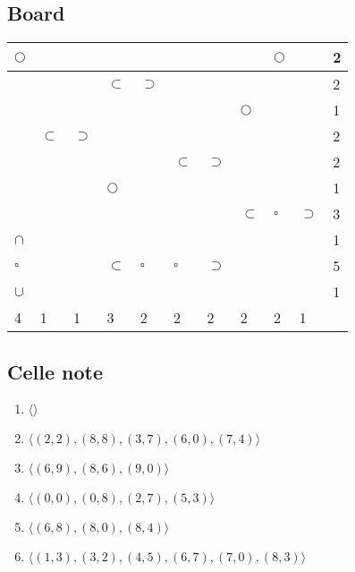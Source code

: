 \documentclass[11pt]{article}
\begin{document}
\subsection{Board}
\begin{table}[H]
    \begin{tabular}{|l|l|l|l|l|l|l|l|l|l||l|}
    \hline
     $\Circle$ &  &  &  &  &  &  &  & $\Circle$ &  & 2 \\ \hline
     &  &  & $\subset$ & $\supset$ &  &  &  &  &  & 2 \\ \hline
     &  &  &  &  &  &  & $\Circle$ &  &  & 1 \\ \hline
     & $\subset$ & $\supset$ &  &  &  &  &  &  &  & 2 \\ \hline
     &  &  &  &  & $\subset$ & $\supset$ &  &  &  & 2 \\ \hline
     &  &  & $\Circle$ &  &  &  &  &  &  & 1 \\ \hline
     &  &  &  &  &  &  & $\subset$ & $\square$ & $\supset$ & 3 \\ \hline
     $\cap$ &  &  &  &  &  &  &  &  &  & 1 \\ \hline
     $\square$ &  &  & $\subset$ & $\square$ & $\square$ & $\supset$ &  &  &  & 5 \\ \hline
     $\cup$ &  &  &  &  &  &  &  &  &  & 1 \\ \hline \hline
     4 & 1 & 1 & 3 & 2 & 2 & 2 & 2 & 2 & 1 & \\ \hline
    \end{tabular}
\end{table}

\subsection{Celle note}
\begin{enumerate}
    \item $\langle \rangle$
    \item $\langle (2, 2), (8, 8), (3, 7), (6, 0), (7, 4) \rangle$
    \item $\langle (6, 9), (8, 6), (9, 0) \rangle$
    \item $\langle (0, 0), (0, 8), (2, 7), (5, 3) \rangle$
    \item $\langle (6, 8), (8, 0), (8, 4) \rangle$
    \item $\langle (1, 3), (3, 2), (4, 5), (6, 7), (7, 0), (8, 3) \rangle$
\end{enumerate}
\end{document}
